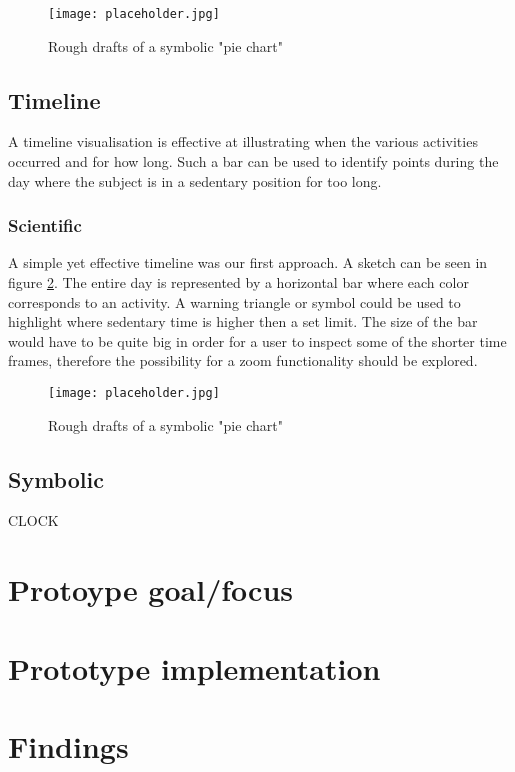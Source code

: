 \begin{figure}[h!]
	\centering
		\texttt{[image: placeholder.jpg]}
		\caption{\footnotesize Rough drafts of a symbolic "pie chart"}
		\label{fig:symbolicPie}
\end{figure}

\subsection{Timeline}
A timeline visualisation is effective at illustrating when the various activities occurred and for how long. Such a bar can be used to identify points during the day where the subject is in a sedentary position for too long.

\subsubsection{Scientific}
A simple yet effective timeline was our first approach. A sketch can be seen in figure \ref{fig:simpleTimeline}. The entire day is represented by a horizontal bar where each color corresponds to an activity. A warning triangle or symbol could be used to highlight where sedentary time is higher then a set limit. The size of the bar would have to be quite big in order for a user to inspect some of the shorter time frames, therefore the possibility for a zoom functionality should be explored.

\begin{figure}[h!]
	\centering
		\texttt{[image: placeholder.jpg]}
		\caption{\footnotesize Rough drafts of a symbolic "pie chart"}
		\label{fig:simpleTimeline}
\end{figure}

\subsection{Symbolic}
CLOCK
\section{Protoype goal/focus}

\section{Prototype implementation}

\section{Findings}